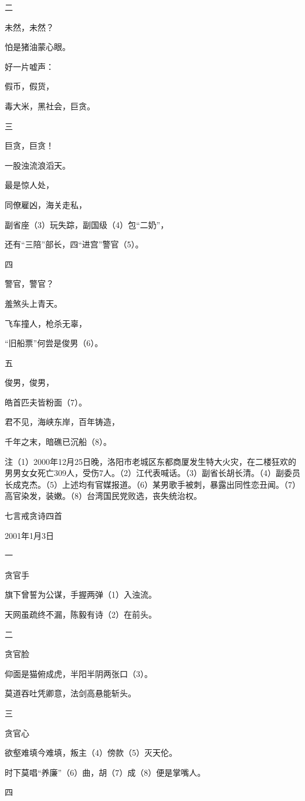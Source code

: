 \documentclass[../../dazhuan.tex]{subfiles}
\begin{document}
二

未然，未然？

怕是猪油蒙心眼。

好一片嘘声：

假币，假货，

毒大米，黑社会，巨贪。

三

巨贪，巨贪！

一股浊流浪滔天。

最是惊人处，

同僚雇凶，海关走私，

副省座（3）玩失踪，副国级（4）包“二奶”，

还有“三陪”部长，四“进宫”警官（5）。

四

警官，警官？

羞煞头上青天。

飞车撞人，枪杀无辜，

“旧船票”何尝是俊男（6）。

五

俊男，俊男，

皓首匹夫皆粉面（7）。

君不见，海峡东岸，百年铸造，

千年之末，暗礁已沉船（8）。

注（1）2000年12月25日晚，洛阳市老城区东都商厦发生特大火灾，在二楼狂欢的男男女女死亡309人，受伤7人。（2）江代表喊话。（3）副省长胡长清。（4）副委员长成克杰。（5）上述均有官媒报道。（6）某男歌手被刺，暴露出同性恋丑闻。（7）高官染发，装嫩。（8）台湾国民党败选，丧失统治权。



七言戒贪诗四首

2001年1月3日

一

贪官手

旗下曾誓为公谋，手握两弹（1）入浊流。

天网虽疏终不漏，陈毅有诗（2）在前头。

二

贪官脸

仰面是猫俯成虎，半阳半阴两张口（3）。

莫道吞吐凭卿意，法剑高悬能斩头。

三

贪官心

欲壑难填今难填，叛主（4）傍款（5）灭天伦。

时下莫唱“养廉”（6）曲，胡（7）成（8）便是掌嘴人。

四
\end{document}
